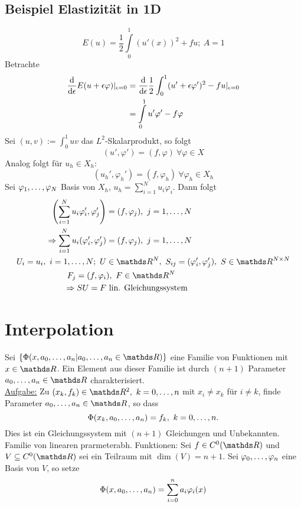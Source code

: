 \subsection{Beispiel Elastizität in 1D}
\label{sub:bsp_elastizitaet}
\[
E(u)= \frac{1}{2}\int\limits_{0}^{1}(u'(x))^2+ fu;~A=1
\]
Betrachte
\begin{equation*}
\begin{aligned}
	\frac{\mathrm{d}  }{\mathrm{d} \epsilon} E(u+\epsilon\varphi)|_{\epsilon=0} &= \frac{\mathrm{d}  }{\mathrm{d} \epsilon} \frac{1}{2}\int_{0}^{1}(u'+\epsilon\varphi')^2-fu|_{\epsilon=0}\\
	&= \int\limits_{0}^{1}u'\varphi'-f\varphi
\end{aligned}
\end{equation*}
Sei $(u,v):=\int_{0}^{1}uv$ das $L^2$-Skalarprodukt, so folgt
\[
(u',\varphi')=(f,\varphi)~\forall \varphi\in X
\]
Analog folgt für $u_h\in X_h$:
\[
(u_h',\varphi_h')=(f,\varphi_h)~\forall \varphi_h\in X_h
\]
Sei $\varphi_1, \dots ,\varphi_N$ Basis von $X_h$, $u_h=\sum_{i=1}^{N}u_i\varphi_i$.
Dann folgt
\begin{equation*}
\begin{aligned}
	\enbrace{\sum_{i=1}^{N}u_i\varphi_i',\varphi_j'}&=(f,\varphi_j),~j=1\dt{,}N\\
	\Rightarrow \sum_{i=1}^{N}u_i(\varphi_i',\varphi_j')&=(f,\varphi_j),~j=1\dt{,}N\\
	U_i=u_i,~i=1\dt{,}N;~U&\in \R^N,~S_{ij}=(\varphi_i',\varphi_j'),~S\in \R^{N\times N}\\
	F_j=(f,\varphi_i&),~F\in \R^N\\
	\Rightarrow SU=F &\text{ lin. Gleichungssystem}
\end{aligned}
\end{equation*}
\section{Interpolation}
\label{sec:interpolation}
Sei $\penbrace{\Phi(x,a_0\dt{,}a_n|a_0\dt{,}a_n\in \R)}$ eine Familie von Funktionen mit $x\in \R$.
Ein Element aus dieser Familie ist durch $(n+1)$ Parameter $a_0\dt{,}a_n\in \R$ charakterisiert.\\
\uline{Aufgabe:} Zu $(x_k,f_k)\in \R^2,~k=0\dt{,}n$ mit $x_i\neq x_k$ für $i\neq k$, finde Parameter $a_0\dt{,}a_n\in \R$, so dass
\[
\Phi(x_k,a_0, \dots ,a_n)=f_k,~k=0, \dots ,n.
\]
Dies ist ein Gleichungssystem mit $(n+1)$ Gleichungen und Unbekannten.\\
Familie von linearen prarmeterabh. Funktionen:
Sei $f\in C^0(\R)$ und $V\subseteq C^0(\R)$ sei ein Teilraum mit $\dim(V)=n+1$.
Sei $\varphi_0, \dots ,\varphi_n$ eine Basis von $V$, so setze
\[
\Phi(x,a_0, \dots ,a_n)=\sum_{i=0}^{n}a_i\varphi_i(x)
\]

